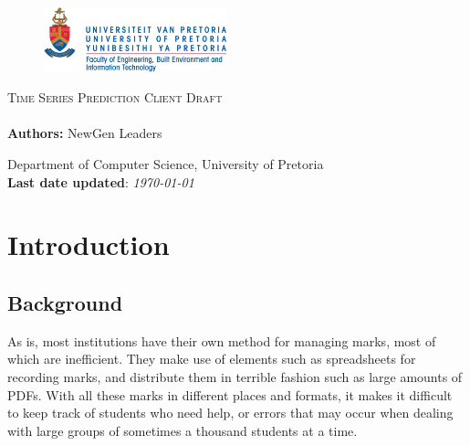 \documentclass[12pt]{article}
\begin{document}
\begin{titlepage}
	
	\begin{center}
		
		
		\begin{figure}[t]
			\centering
			\includegraphics[width=200px]{../images/up_logo.jpg}
		\end{figure}
		
		\textsc{\Huge Time Series Prediction Client Draft} \\ 
	
		\textbf{\huge \\Authors:} 
		\huge NewGen Leaders\\

		\begin{flushright} \large
		\end{flushright}
		\small Department of Computer Science, University of Pretoria \\
		[6mm]
		{\textbf{Last date updated}: \textit{\today}\\}
		
		
	\end{center}

\end{titlepage}

\pagebreak

\tableofcontents

\pagebreak

\section{Introduction}

	\subsection{Background}
	As is, most institutions have their own method for managing marks, most of which are inefficient. They make use of elements such as spreadsheets for recording marks, and distribute them in terrible fashion such as large amounts of PDFs. With all these marks in different places and formats, it makes it difficult to keep track of students who need help, or errors that may occur when dealing with large groups of sometimes a thousand students at a time.
	
\end{document}

